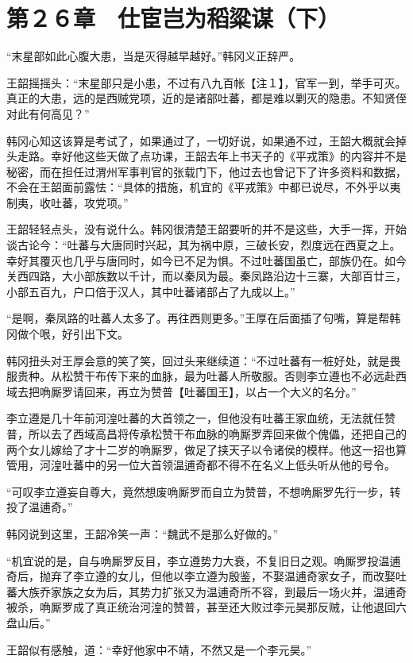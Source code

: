 \section{第２６章　仕宦岂为稻粱谋（下）}

“末星部如此心腹大患，当是灭得越早越好。”韩冈义正辞严。

王韶摇摇头：“末星部只是小患，不过有八九百帐【注１】，官军一到，举手可灭。真正的大患，远的是西贼党项，近的是诸部吐蕃，都是难以剿灭的隐患。不知贤侄对此有何高见？”

韩冈心知这该算是考试了，如果通过了，一切好说，如果通不过，王韶大概就会掉头走路。幸好他这些天做了点功课，王韶去年上书天子的《平戎策》的内容并不是秘密，而在担任过渭州军事判官的张载门下，他过去也曾记下了许多资料和数据，不会在王韶面前露怯：“具体的措施，机宜的《平戎策》中都已说尽，不外乎以夷制夷，收吐蕃，攻党项。”

王韶轻轻点头，没有说什么。韩冈很清楚王韶要听的并不是这些，大手一挥，开始谈古论今：“吐蕃与大唐同时兴起，其为祸中原，三破长安，烈度远在西夏之上。幸好其覆灭也几乎与唐同时，如今已不足为惧。不过吐蕃国虽亡，部族仍在。如今关西四路，大小部族数以千计，而以秦凤为最。秦凤路沿边十三寨，大部百廿三，小部五百九，户口倍于汉人，其中吐蕃诸部占了九成以上。”

“是啊，秦凤路的吐蕃人太多了。再往西则更多。”王厚在后面插了句嘴，算是帮韩冈做个哏，好引出下文。

韩冈扭头对王厚会意的笑了笑，回过头来继续道：“不过吐蕃有一桩好处，就是畏服贵种。从松赞干布传下来的血脉，最为吐蕃人所敬服。否则李立遵也不必远赴西域去把唃厮罗请回来，再立为赞普【吐蕃国王】，以占一个大义的名分。”

李立遵是几十年前河湟吐蕃的大首领之一，但他没有吐蕃王家血统，无法就任赞普，所以去了西域高昌将传承松赞干布血脉的唃厮罗弄回来做个傀儡，还把自己的两个女儿嫁给了才十二岁的唃厮罗，做足了挟天子以令诸侯的模样。他这一招也算管用，河湟吐蕃中的另一位大首领温逋奇都不得不在名义上低头听从他的号令。

“可叹李立遵妄自尊大，竟然想废唃厮罗而自立为赞普，不想唃厮罗先行一步，转投了温逋奇。”

韩冈说到这里，王韶冷笑一声：“魏武不是那么好做的。”

“机宜说的是，自与唃厮罗反目，李立遵势力大衰，不复旧日之观。唃厮罗投温逋奇后，抛弃了李立遵的女儿，但他以李立遵为殷鉴，不娶温逋奇家女子，而改娶吐蕃大族乔家族之女为后，其势力扩张又为温逋奇所不容，到最后一场火并，温逋奇被杀，唃厮罗成了真正统治河湟的赞普，甚至还大败过李元昊那反贼，让他退回六盘山后。”

王韶似有感触，道：“幸好他家中不靖，不然又是一个李元昊。”

